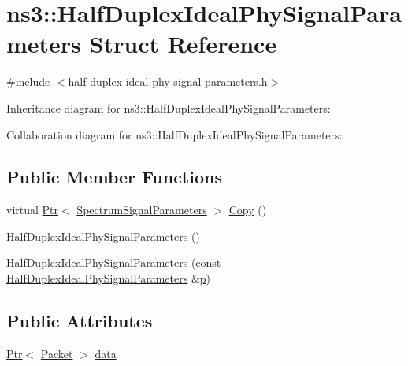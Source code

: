\hypertarget{structns3_1_1HalfDuplexIdealPhySignalParameters}{}\section{ns3\+:\+:Half\+Duplex\+Ideal\+Phy\+Signal\+Parameters Struct Reference}
\label{structns3_1_1HalfDuplexIdealPhySignalParameters}


{\ttfamily \#include $<$half-\/duplex-\/ideal-\/phy-\/signal-\/parameters.\+h$>$}



Inheritance diagram for ns3\+:\+:Half\+Duplex\+Ideal\+Phy\+Signal\+Parameters\+:


Collaboration diagram for ns3\+:\+:Half\+Duplex\+Ideal\+Phy\+Signal\+Parameters\+:
\subsection*{Public Member Functions}
\begin{DoxyCompactItemize}
\item 
virtual \hyperlink{classns3_1_1Ptr}{Ptr}$<$ \hyperlink{structns3_1_1SpectrumSignalParameters}{Spectrum\+Signal\+Parameters} $>$ \hyperlink{structns3_1_1HalfDuplexIdealPhySignalParameters_a9c978e1b4dd1b284744177ce2c6cdab4}{Copy} ()
\item 
\hyperlink{structns3_1_1HalfDuplexIdealPhySignalParameters_ab89fc73e72fd3b2d7607c0ef434179a6}{Half\+Duplex\+Ideal\+Phy\+Signal\+Parameters} ()
\item 
\hyperlink{structns3_1_1HalfDuplexIdealPhySignalParameters_a95997dca80176ea662c8780f8a2406e6}{Half\+Duplex\+Ideal\+Phy\+Signal\+Parameters} (const \hyperlink{structns3_1_1HalfDuplexIdealPhySignalParameters}{Half\+Duplex\+Ideal\+Phy\+Signal\+Parameters} \&\hyperlink{lte__link__budget__x2__handover__measures_8m_ac9de518908a968428863f829398a4e62}{p})
\end{DoxyCompactItemize}
\subsection*{Public Attributes}
\begin{DoxyCompactItemize}
\item 
\hyperlink{classns3_1_1Ptr}{Ptr}$<$ \hyperlink{classns3_1_1Packet}{Packet} $>$ \hyperlink{structns3_1_1HalfDuplexIdealPhySignalParameters_a97770eb65c136407ddb1cdea719be309}{data}
\end{DoxyCompactItemize}
